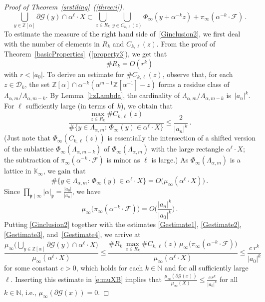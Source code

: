 \documentclass[12pt]{amsart}
\theoremstyle{definition}
\theoremstyle{remark}
\numberwithin{equation}{section}
\begin{document}
\begin{proof}[Proof of Theorem~\ref{srstiling}~(\ref{three:i})]
\begin{equation}
\bigcup_{y\in\mathbb{Z}[\alpha]} \partial\mathcal{G}(y) \cap \alpha^\ell \cdot X
\subset
\bigcup_{z\in R_k} \bigcup_{y\in C_{k,\ell}(z)} \Phi_\infty(y + \alpha^{-k} z) + \pi_\infty(\alpha^{-k} \cdot \mathcal{F})\,.
\end{equation}
To estimate the measure of the right hand side of~\eqref{Ginclusion2}, we first deal with the number of elements in $R_k$ and $C_{k,\ell}(z)$. From the proof of Theorem~\ref{basicProperties}~(\ref{property3}), we get that 
\begin{equation}\label{Gestimate1}
\# R_k = O(r^k)
\end{equation}
with $r < |a_0|$.
To derive an estimate for $\# C_{k,\ell}(z)$, observe that, for each $z \in \mathcal{D}_k$, the set $\mathbb{Z}[\alpha] \cap \alpha^{-k} (\alpha^{m-1}\mathbb{Z}[\alpha^{-1}]-z)$ forms a residue class of $\Lambda_{\alpha,m} / \Lambda_{\alpha,m-k}$.
By Lemma~\ref{l:zLambda}, the cardinality of $\Lambda_{\alpha,m} / \Lambda_{\alpha,m-k}$ is~$|a_n|^k$.
For $\ell$ sufficiently large (in terms of~$k$), we obtain that 
\begin{equation}\label{Gestimate2}
\frac{\max_{z\in R_k} \# C_{k,\ell}(z)}{\# \big\{y \in \Lambda_{\alpha,m}:\, \Phi_\infty(y) \in \alpha^\ell \cdot X\big\}} \le \frac{2}{|a_n|^k}\,.
\end{equation}
(Just note that $\Phi_\infty(C_{k,\ell}(z))$ is essentially the intersection of a shifted version of the sublattice $\Phi_\infty(\Lambda_{\alpha, m-k})$ of $\Phi_\infty(\Lambda_{\alpha, m})$ with the large rectangle $\alpha^\ell\cdot X$; the subtraction of $\pi_\infty(\alpha^{-k} \cdot \mathcal{F})$ is minor as $\ell$ is large.) 
As $\Phi_\infty(\Lambda_{\alpha,m})$ is a lattice in $\mathbb{K}_\infty$, we gain that 
\begin{equation}\label{Gestimate3}
\# \{y \in \Lambda_{\alpha,m}:\, \Phi_\infty(y) \in \alpha^\ell \cdot X\} = O\big(\mu_\infty(\alpha^\ell \cdot X)\big)\,.
\end{equation}
Since $\prod_{\mathfrak{p}\mid\infty} |\alpha|_\mathfrak{p} = \frac{|a_0|}{|a_n|}$, we have
\begin{equation}\label{Gestimate4}
\mu_\infty\big(\pi_\infty(\alpha^{-k} \cdot \mathcal{F})\big) = O\bigg(\frac{|a_n|^k}{|a_0|^k}\bigg)\,.
\end{equation}
Putting \eqref{Ginclusion2} together with the estimates \eqref{Gestimate1},  \eqref{Gestimate2}, \eqref{Gestimate3}, and~\eqref{Gestimate4}, we arrive at
\[
\frac{\mu_\infty\big(\bigcup_{y\in\mathbb{Z}[\alpha]} \partial\mathcal{G}(y) \cap \alpha^\ell \cdot X\big)}{\mu_\infty(\alpha^\ell \cdot X)} \le \frac{\# R_k\, \max_{z\in R_k} \# C_{k,\ell}(z)\, \mu_\infty\big(\pi_\infty(\alpha^{-k} \cdot \mathcal{F})\big)}{\mu_\infty(\alpha^\ell \cdot X)} \le  \frac{c\,r^k}{|a_0|^k}
\]
for some constant $c > 0$, which holds for each $k \in \mathbb{N}$ and for all sufficiently large~$\ell$. 
Inserting this estimate in \eqref{e:muXB} implies that $\frac{\mu_\infty(\partial\mathcal{G}(x))}{\mu_\infty(X)} \le \frac{c\,r^k}{|a_0|^k}$ for all $k \in \mathbb{N}$, i.e., $\mu_\infty(\partial\mathcal{G}(x)) = 0$. 
\end{proof}
\end{document}
